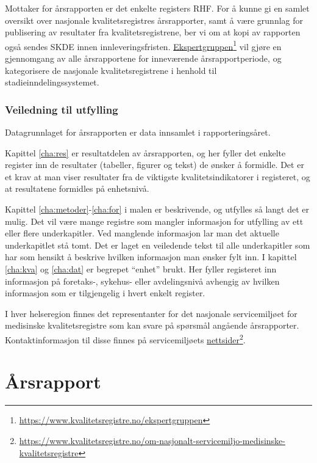 \documentclass[norsk, a4paper, twocolumn]{report}
\begin{document}
Mottaker for årsrapporten er det enkelte registers RHF. For å kunne gi en
samlet oversikt over nasjonale kvalitetsregistres årsrapporter, samt å være
grunnlag for publisering av resultater fra kvalitetsregistrene, ber vi om at
kopi av rapporten også sendes SKDE innen innleveringsfristen.
\href{https://www.kvalitetsregistre.no/ekspertgruppen}{Ekspertgruppen}\footnote{\url{https://www.kvalitetsregistre.no/ekspertgruppen}}
vil gjøre en gjennomgang av alle årsrapportene for inneværende
årsrapportperiode, og kategorisere de nasjonale kvalitetsregistrene i henhold
til stadieinndelingssystemet.


\section*{Veiledning til utfylling}
Datagrunnlaget for årsrapporten er data innsamlet i rapporteringsåret.

Kapittel \ref{cha:res} er resultatdelen av årsrapporten, og her fyller det
enkelte register inn de resultater (tabeller, figurer og tekst) de ønsker å
formidle. Det er et krav at man viser resultater fra de viktigste
kvalitetsindikatorer i registeret, og at resultatene formidles på enhetsnivå.

Kapittel \ref{cha:metoder}-\ref{cha:for} i malen er beskrivende, og utfylles så
langt det er mulig. Det vil være mange registre som mangler informasjon for
utfylling av ett eller flere underkapitler. Ved manglende informasjon lar man
det aktuelle underkapitlet stå tomt. Det er laget en veiledende tekst til alle
underkapitler som har som hensikt å beskrive hvilken informasjon man ønsker fylt
inn. I kapittel \ref{cha:kva} og \ref{cha:dat} er begrepet ``enhet'' brukt.
Her fyller registeret inn informasjon på foretaks-, sykehus- eller avdelingsnivå
avhengig av hvilken informasjon som er tilgjengelig i hvert enkelt register. 

I hver helseregion finnes det representanter for det nasjonale
servicemiljøet for medisinske kvalitetsregistre som kan svare på spørsmål
angående årsrapporter. Kontaktinformasjon til disse finnes på servicemiljøets
\href{https://www.kvalitetsregistre.no/om-nasjonalt-servicemiljo-medisinske-kvalitetsregistre}{nettsider}\footnote{\url{https://www.kvalitetsregistre.no/om-nasjonalt-servicemiljo-medisinske-kvalitetsregistre}}.




\tableofcontents




\part{Årsrapport}\label{par:rap}
\thispagestyle{empty}
\twocolumn
\end{document}
